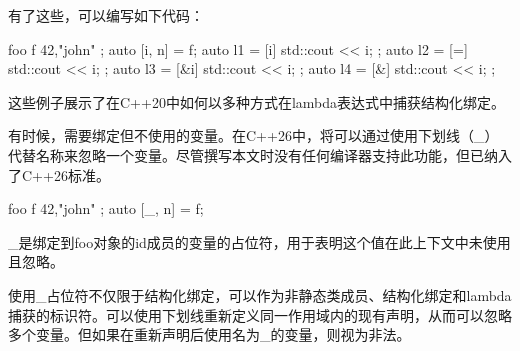 有了这些，可以编写如下代码：

\begin{cpp}
foo f{ 42,"john" };
auto [i, n] = f;
auto l1 = [i] {std::cout << i; };
auto l2 = [=] {std::cout << i; };
auto l3 = [&i] {std::cout << i; };
auto l4 = [&] {std::cout << i; };
\end{cpp}

这些例子展示了在C++20中如何以多种方式在lambda表达式中捕获结构化绑定。

有时候，需要绑定但不使用的变量。在C++26中，将可以通过使用下划线（\_）代替名称来忽略一个变量。尽管撰写本文时没有任何编译器支持此功能，但已纳入了C++26标准。

\begin{cpp}
foo f{ 42,"john" };
auto [_, n] = f;
\end{cpp}

\_是绑定到foo对象的id成员的变量的占位符，用于表明这个值在此上下文中未使用且忽略。

使用\_占位符不仅限于结构化绑定，可以作为非静态类成员、结构化绑定和lambda捕获的标识符。可以使用下划线重新定义同一作用域内的现有声明，从而可以忽略多个变量。但如果在重新声明后使用名为\_的变量，则视为非法。


















